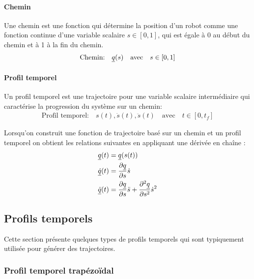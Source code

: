 \paragraph{Chemin} Une chemin est une fonction qui détermine la position d'un robot comme une fonction continue d'une variable scalaire $s \in [0,1]$, qui est égale à 0 au début du chemin et à 1 à la fin du chemin. 
\begin{align}
    \text{Chemin:} \quad \underline{q}(s) \quad \text{avec} \quad s \in [0,1]
\end{align}

\paragraph{Profil temporel}  Un profil temporel est une trajectoire pour une variable scalaire intermédiaire qui caractérise la progression du système sur un chemin:
\begin{align}
    \text{Profil temporel:} \quad s(t), \dot{s}(t), \ddot{s}(t) \quad \text{avec} \quad t \in [0,t_f]
\end{align}

Lorsqu'on construit une fonction de trajectoire basé sur un chemin et un profil temporel on obtient les relations suivantes en appliquant une dérivée en chaîne :
\begin{align}
    \underline{q}(t)       &=  \underline{q}(s(t))\\
    \underline{\dot{q}}(t) &= \frac{\partial \underline{q}}{ \partial s}  \dot{s}    \\
    \underline{\ddot{q}}(t)&= \frac{\partial \underline{q}}{ \partial s}  \ddot{s} + \frac{\partial^2 \underline{q}}{ \partial s^2}  \dot{s}^2
\end{align}


\subsection{Profils temporels}

Cette section présente quelques types de profils temporels qui sont typiquement utilisée pour générer des trajectoires.

\subsubsection{Profil temporel trapézoïdal}


